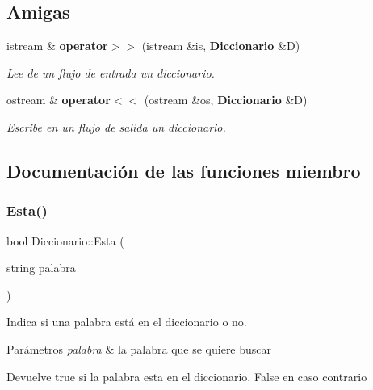 \subsection*{Amigas}
\begin{DoxyCompactItemize}
\item 
istream \& \textbf{ operator$>$$>$} (istream \&is, \textbf{ Diccionario} \&D)
\begin{DoxyCompactList}\small\item\em Lee de un flujo de entrada un diccionario. \end{DoxyCompactList}\item 
ostream \& \textbf{ operator$<$$<$} (ostream \&os, \textbf{ Diccionario} \&D)
\begin{DoxyCompactList}\small\item\em Escribe en un flujo de salida un diccionario. \end{DoxyCompactList}\end{DoxyCompactItemize}


\subsection{Documentación de las funciones miembro}
\mbox{\label{classDiccionario_a2091d415bc53c34a0e78e7bd9b073024}} 
\subsubsection{Esta()}
{\footnotesize\ttfamily bool Diccionario\+::\+Esta (\begin{DoxyParamCaption}\item[{string}]{palabra }\end{DoxyParamCaption})\hspace{0.3cm}{\ttfamily [inline]}}



Indica si una palabra está en el diccionario o no. 


\begin{DoxyParams}{Parámetros}
{\em palabra} & la palabra que se quiere buscar \\
\hline
\end{DoxyParams}
\begin{DoxyReturn}{Devuelve}
true si la palabra esta en el diccionario. False en caso contrario 
\end{DoxyReturn}
\mbox{\label{classDiccionario_a11f24f812f9aab727dc5ef088aa0d45b}} 
